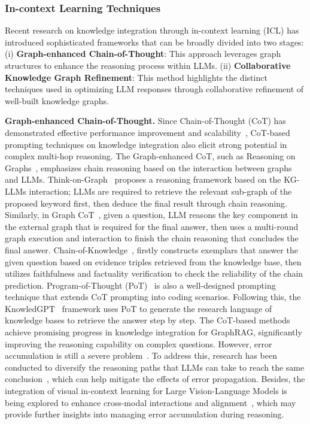 \documentclass[lettersize,journal]{IEEEtran}
\begin{document}
\subsubsection{In-context Learning Techniques}
Recent research on knowledge integration through in-context learning (ICL) has introduced sophisticated frameworks that can be broadly divided into two stages: 
(i) \textbf{Graph-enhanced Chain-of-Thought}: This approach leverages graph structures to enhance the reasoning process within LLMs.
(ii) \textbf{Collaborative Knowledge Graph Refinement}: This method highlights the distinct techniques used in optimizing LLM responses through collaborative refinement of well-built knowledge graphs.

\noindent\textbf{Graph-enhanced Chain-of-Thought.}
Since Chain-of-Thought (CoT) has demonstrated effective performance improvement and scalability~\cite{zhang2023automatic}, CoT-based prompting techniques on knowledge integration also elicit strong potential in complex multi-hop reasoning. The Graph-enhanced CoT, such as Reasoning on Graphs~\cite{luo2024reasoning}, emphasizes chain reasoning based on the interaction between graphs and LLMs.
Think-on-Graph~\cite{sun2024thinkongraph,ma2024think-on-graph-2.0} proposes a reasoning framework based on the KG-LLMs interaction; LLMs are required to retrieve the relevant sub-graph of the proposed keyword first, then deduce the final result through chain reasoning. Similarly, in Graph CoT~\cite{jin2024graph}, given a question, LLM reasons the key component in the external graph that is required for the final answer, then uses a multi-round graph execution and interaction to finish the chain reasoning that concludes the final answer. Chain-of-Knowledge~\cite{li2024chainofknowledge}, firstly constructs exemplars that answer the given question based on evidence triples retrieved from the knowledge base, then utilizes faithfulness and factuality verification to check the reliability of the chain prediction. Program-of-Thought (PoT)~\cite{wang2023plan,bi2024program} is also a well-designed prompting technique that extends CoT prompting into coding scenarios. Following this, the KnowledGPT~\cite{wang2023knowledgpt} framework uses PoT to generate the research language of knowledge bases to retrieve the answer step by step.
The CoT-based methods achieve promising progress in knowledge integration for GraphRAG, significantly improving the reasoning capability on complex questions. However, error accumulation is still a severe problem~\cite{ma2021markov,bai2024transformers}. To address this, research has been conducted to diversify the reasoning paths that LLMs can take to reach the same conclusion~\cite{li2024different,xie2022an}, which can help mitigate the effects of error propagation. Besides, the integration of visual in-context learning for Large Vision-Language Models is being explored to enhance cross-modal interactions and alignment~\cite{zhou2024visual,zhang2023makes}, which may provide further insights into managing error accumulation during reasoning.
\end{document}
